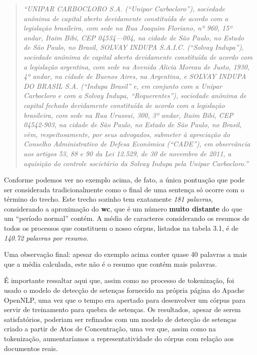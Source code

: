 \documentclass[11pt]{report}
\newcommand{\quotes}[1]{``#1''}
\begin{document}
\begin{quote}
  \textit{\quotes{UNIPAR CARBOCLORO S.A. (“Unipar Carbocloro”), sociedade anônima de capital aberto devidamente constituída de acordo com a legislação brasileira, com sede na Rua
  Joaquim Floriano, nº 960, 15º andar, Itaim Bibi, CEP 04534—004, na cidade de São Paulo, no Estado de São Paulo, no Brasil, SOLVAY INDUPA S.A.I.C. (“Solvay Indupa”),
  sociedade anônima de capital aberto devidamente constituída de acordo com a legislação argentina, com sede na Avenida Alicia Moreau de Justo, 1930, 4º andar, na cidade de
  Buenos Aires, na Argentina, e SOLVAY INDUPA DO BRASIL S.A. (“Indupa Brasil” e, em conjunto com a Unipar Carbocloro e com a Solvay Indupa, “Requerentes”), sociedade anônima
  de capital fechado devidamente constituída de acordo com a legislação brasileira, com sede na Rua Urussui, 300, 3º andar, Itaim Bibi, CEP 04542-903, na cidade de São Paulo,
  no Estado de São Paulo, no Brasil, vêm, respeitosamente, por seus advogados, submeter à apreciação do Conselho Administrativo de Defesa Econômica (“CADE”), em observância aos
  artigos 53, 88 e 90 da Lei 12.529, de 30 de novembro de 2011, a aquisição do controle societário da Solvay Indupa pela Unipar Carbocloro.}}
\end{quote}

Conforme podemos ver no exemplo acima, de fato, a única pontuação que pode ser considerada tradicionalmente como o final de uma sentença só ocorre com o término do trecho. Este trecho
sozinho tem exatamente \textit{181 palavras}, considerando a aproximação do \textbf{wc}, que é um número \textbf{muito distante} do que um \quotes{período normal} contém. A média
de caracteres considerando os resumos de todos os processos que constituem o nosso córpus, listados na tabela 3.1, é de \textit{140.72 palavras por resumo}.

Uma observação final: apesar do exemplo acima conter quase 40 palavras a mais que a média calculada, este não é o resumo que contém mais palavras.

É importante ressaltar aqui que, assim como no processo de tokenização, foi usado o modelo de detecção de setenças fornecido na própria página do Apache OpenNLP, uma vez que o tempo era
apertado para desenvolver um córpus para servir de treinamento para quebra de setenças. Os resultados, apesar de serem satisfatórios, poderiam ser refinados com um modelo
de detecção de setenças criado a partir de Atos de Concentração, uma vez que, assim como na tokenização, aumentaríamos a representatividade do córpus com relação aos documentos
reais.
\end{document}

